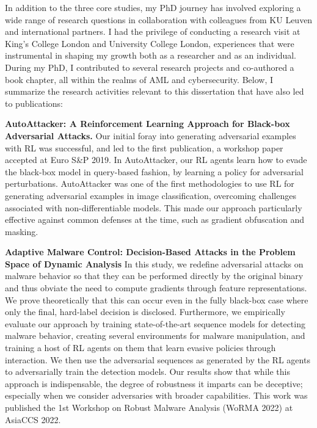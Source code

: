 In addition to the three core studies, my PhD journey has involved exploring a wide range of research questions in collaboration with colleagues from KU Leuven and international partners.
I had the privilege of conducting a research visit at King's College London and University College London, experiences that were instrumental in shaping my growth both as a researcher and as an individual.
During my PhD, I contributed to several research projects and co-authored a book chapter, all within the realms of \gls{AML} and cybersecurity.
Below, I summarize the research activities relevant to this dissertation that have also led to publications:

\textbf{AutoAttacker: A Reinforcement Learning Approach for Black-box Adversarial Attacks.}
Our initial foray into generating adversarial examples with \gls{RL} was successful, and led to the first publication, a workshop paper accepted at Euro S\&P 2019.
In AutoAttacker, our \gls{RL} agents learn how to evade the black-box model in query-based fashion, by learning a policy for adversarial perturbations.
AutoAttacker was one of the first methodologies to use \gls{RL} for generating adversarial examples in image classification, overcoming challenges associated with non-differentiable models.
This made our approach particularly effective against common defenses at the time, such as gradient obfuscation and masking.  

\begin{myleftbar}
\end{myleftbar}

\textbf{Adaptive Malware Control: Decision-Based Attacks in the Problem Space of Dynamic Analysis}
In this study, we redefine adversarial attacks on malware behavior so that they can be performed directly by the original binary and thus obviate the need to compute gradients through feature representations.
We prove theoretically that this can occur even in the fully black-box case where only the final, hard-label decision is disclosed.
Furthermore, we empirically evaluate our approach by training state-of-the-art sequence models for detecting malware behavior, creating several environments for malware manipulation, and training a host of \gls{RL} agents on them that learn evasive policies through interaction.
We then use the adversarial sequences as generated by the RL agents to adversarially train the detection models.
Our results show that while this approach is indispensable, the degree of robustness it imparts can be deceptive; especially when we consider adversaries with broader capabilities.
This work was published the 1st Workshop on Robust Malware Analysis (WoRMA 2022) at AsiaCCS 2022.

